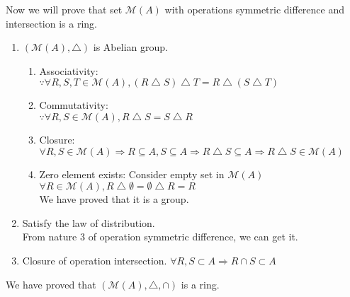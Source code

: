\documentclass[12pt]{article}
\theoremstyle{neosn}
\begin{document}
    Now we will prove that set $\mathscr{M}(A)$ with operations symmetric difference and intersection is a ring.\\
    \begin{enumerate}
        \item $(\mathscr{M}(A),\bigtriangleup)$ is Abelian group.\\
            \begin{enumerate}
                \item Associativity:\\
                    $\because \forall R,S,T \in \mathscr{M}(A), (R\bigtriangleup S)\bigtriangleup T =  R\bigtriangleup (S\bigtriangleup T)$\\
                \item Commutativity:\\
                    $\because \forall R,S \in \mathscr{M}(A), R\bigtriangleup S = S \bigtriangleup R$\\
                \item Closure:\\
                    $\forall R,S \in \mathscr{M}(A) \Rightarrow R \subseteq A, S \subseteq A \Rightarrow R\bigtriangleup S \subseteq A
                    \Rightarrow R\bigtriangleup S \in \mathscr{M}(A)$
                \item Zero element exists:
                    Consider empty set in $\mathscr{M}(A)$\\
                    $\forall R \in \mathscr{M}(A), R \bigtriangleup \emptyset = \emptyset \bigtriangleup R = R$\\
                We have proved that it is a group.    
            \end{enumerate}

        \item Satisfy the law of distribution.\\
           From nature 3 of operation symmetric difference, we can get it.
        
        \item  Closure of operation intersection.
            $\forall R,S \subset A \Rightarrow R \cap S \subset A$
    \end{enumerate}

    We have proved that $(\mathscr{M}(A),\bigtriangleup,\cap)$ is a ring.
\end{document}
